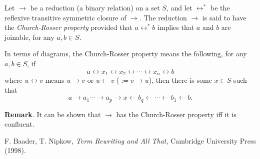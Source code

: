 \documentclass[12pt]{article}
\begin{document}
Let $\to$ be a reduction (a binary relation) on a set $S$, and let $\leftrightarrow^*$ be the reflexive transitive symmetric closure of $\to$.  The reduction $\to$ is said to have the \emph{Church-Rosser property} provided that $a\leftrightarrow^* b$ implies that $a$ and $b$ are joinable, for any $a,b\in S$.

In terms of diagrams, the Church-Rosser property means the following, for any $a,b\in S$, if
$$a\leftrightarrow x_1 \leftrightarrow x_2 \leftrightarrow \cdots \leftrightarrow x_n \leftrightarrow b$$ 
where $u\leftrightarrow v$ means $u\to v$ or $u\leftarrow v$ ($:=v\to u$), then there is some $x\in S$ such that 
$$a \to a_1 \cdots \to a_p \to x \leftarrow b_q \leftarrow \cdots \leftarrow b_1 \leftarrow b.$$

\textbf{Remark}.  It can be shown that $\to$ has the Church-Rosser property iff it is confluent.

\begin{thebibliography}{8}
 F. Baader, T. Nipkow, \emph{Term Rewriting and All That}, Cambridge University Press (1998).
\end{thebibliography}
\end{document}

